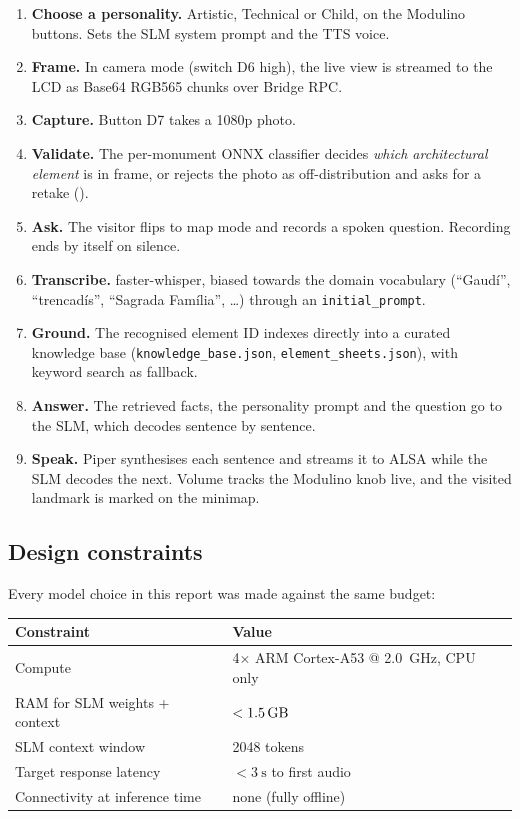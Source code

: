 \documentclass[11pt,a4paper]{article}
\begin{document}
\begin{enumerate}
  \item \textbf{Choose a personality.} Artistic, Technical or Child, on the
        Modulino buttons. Sets the SLM system prompt and the TTS voice.
  \item \textbf{Frame.} In camera mode (switch D6 high), the live view is
        streamed to the LCD as Base64 RGB565 chunks over Bridge RPC.
  \item \textbf{Capture.} Button D7 takes a 1080p photo.
  \item \textbf{Validate.} The per-monument ONNX classifier decides
        \emph{which architectural element} is in frame, or rejects the photo as
        off-distribution and asks for a retake ().
  \item \textbf{Ask.} The visitor flips to map mode and records a spoken
        question. Recording ends by itself on silence.
  \item \textbf{Transcribe.} faster-whisper, biased towards the domain
        vocabulary (``Gaud\'i'', ``trencad\'is'', ``Sagrada Fam\'ilia'',
        \ldots) through an \texttt{initial\_prompt}.
  \item \textbf{Ground.} The recognised element ID indexes directly into a
        curated knowledge base (\texttt{knowledge\_base.json},
        \texttt{element\_sheets.json}), with keyword search as fallback.
  \item \textbf{Answer.} The retrieved facts, the personality prompt and the
        question go to the SLM, which decodes sentence by sentence.
  \item \textbf{Speak.} Piper synthesises each sentence and streams it to ALSA
        while the SLM decodes the next. Volume tracks the Modulino knob live,
        and the visited landmark is marked on the minimap.
\end{enumerate}

\subsection{Design constraints}

Every model choice in this report was made against the same budget:

\begin{center}
\begin{tabular}{lp{9.2cm}}
\toprule
\textbf{Constraint} & \textbf{Value} \\
\midrule
Compute            & 4$\times$ ARM Cortex-A53 @ \SI{2.0}{\giga\hertz}, CPU only \\
RAM for SLM weights + context & $<\SI{1.5}{\giga\byte}$ \\
SLM context window & 2048 tokens \\
Target response latency & $<\SI{3}{\second}$ to first audio \\
Connectivity at inference time & none (fully offline) \\
\bottomrule
\end{tabular}
\end{center}
\end{document}
